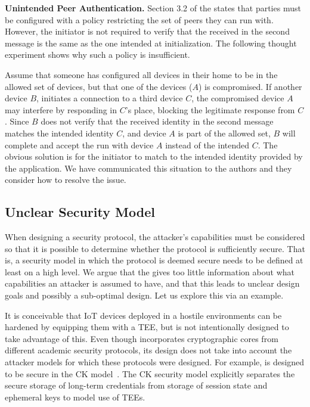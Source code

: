 \documentclass[runningheads, envcountsame, a4paper, draft, x11names]{llncs}
\newcommand{\runhead}[1]{\noindent\textbf{#1. }}
\begin{document}
\runhead{Unintended Peer Authentication}
Section 3.2 of the \mSpec{} states that parties must be configured
with a policy restricting the set of peers they can run \mEdhoc{} with.
%
However, the initiator is not required to verify that the \mIdcredr{} received
in the second message is the same as the one intended at initialization.
%
The following thought experiment shows why such a policy is insufficient.
%

Assume that someone has configured all devices in their home to be in the
allowed set of devices, but that one of the devices ($A$) is compromised.
%
If another device $B$, initiates a connection to a third device $C$, the
compromised device $A$ may interfere by responding in $C$'s place, blocking
the legitimate response from $C$.
%
Since $B$ does not verify that the received identity in the second message
matches the intended identity $C$, and device $A$ is part of the allowed set,
$B$ will complete and accept the \mEdhoc{} run with device $A$ instead of the
intended $C$.
%
The obvious solution is for the initiator to match \mIdcredr{} to the intended
identity provided by the application.
%
We have communicated this situation to the \mEdhoc{} authors and they consider
how to resolve the issue.
%

\subsection{Unclear Security Model}
When designing a security protocol, the attacker's capabilities must be
considered so that it is possible to determine whether the protocol is
sufficiently secure.
%
That is, a security model in which the protocol is deemed
secure needs to be defined at least on a high level.
%
We argue that the \mSpec{} gives too little information about what capabilities
an attacker is assumed to have, and that this leads to unclear design goals and
possibly a sub-optimal design.
%
Let us explore this via an example.
%

It is conceivable that IoT devices deployed in a hostile environments can be
hardened by equipping them with a TEE, but \mEdhoc{} is not intentionally
designed to take advantage of this.
%
Even though \mEdhoc{} incorporates cryptographic cores from different academic
security protocols, its design does not take into account the attacker models
for which these protocols were designed.
%
For example, \mOptls{} is designed to be secure in the CK
model~\cite{DBLP:conf/crypto/CanettiK02}.
%
The CK security model explicitly separates the secure storage of long-term
credentials from storage of session state and ephemeral keys to model
use of TEEs.
%
\end{document}
